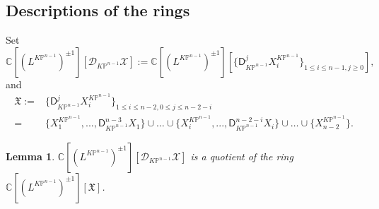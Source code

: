 \documentclass[12pt]{amsart}
\newtheorem{lem}[prop]{Lemma}
\numberwithin{equation}{section}
\newcommand{\KP}{K\mathbb{P}}
\begin{document}
\subsection{Descriptions of the rings}
Set 
\begin{equation*}
\mathbb{C}[(L^{\KP^{n-1}})^{\pm 1}][\mathcal{D}_{\KP^{n-1}}\mathcal{X}]:=\mathbb{C}[(L^{\KP^{n-1}})^{\pm 1}][\{\mathsf{D}_{\KP^{n-1}}^jX^{\KP^{n-1}}_i\}_{1\leq i\leq n-1, j\geq 0}],
\end{equation*}
and
\begin{align*}
\mathfrak{X}
:=&\{\mathsf{D}_{\KP^{n-1}}^jX^{\KP^{n-1}}_i\}_{1\leq i\leq n-2, 0\leq j\leq n-2-i}\\
=&\{X^{\KP^{n-1}}_1,...,\mathsf{D}_{\KP^{n-1}}^{n-3}X_1\}\cup \ldots \cup\{X^{\KP^{n-1}}_i,...,\mathsf{D}_{\KP^{n-1}}^{n-2-i}X_i\}\cup\ldots\cup\{X^{\KP^{n-1}}_{n-2}\}.
\end{align*}

\begin{lem}\label{lem:D_Graded_Ring_X}
 $\mathbb{C}[(L^{\KP^{n-1}})^{\pm 1}][\mathcal{D}_{\KP^{n-1}}\mathcal{X}]$ is a quotient of the ring $\mathbb{C}[(L^{\KP^{n-1}})^{\pm 1}][\mathfrak{X}]$.
\end{lem}
\end{document}
